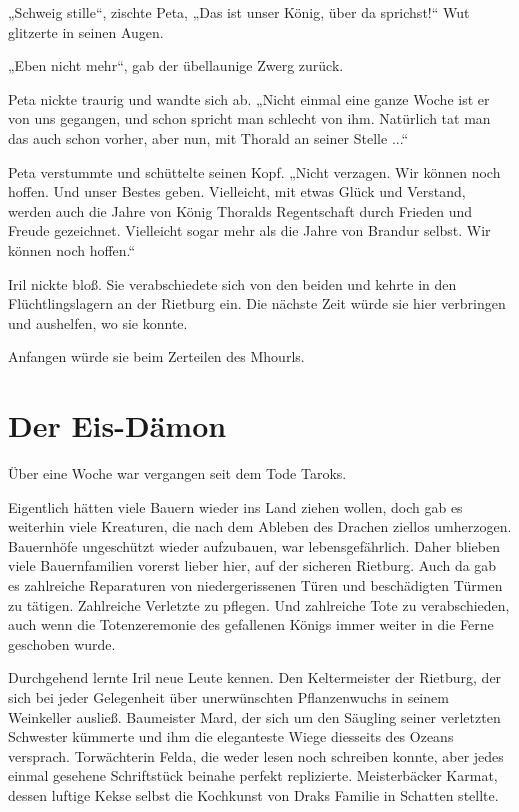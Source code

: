 „Schweig stille“, zischte Peta, „Das ist unser König, über da sprichst!“ Wut glitzerte in seinen Augen.

„Eben nicht mehr“, gab der übellaunige Zwerg zurück.

Peta nickte traurig und wandte sich ab. „Nicht einmal eine ganze Woche ist er von uns gegangen, und schon spricht man schlecht von ihm. Natürlich tat man das auch schon vorher, aber nun, mit Thorald an seiner Stelle ...“

Peta verstummte und schüttelte seinen Kopf. „Nicht verzagen. Wir können noch hoffen. Und unser Bestes geben. Vielleicht, mit etwas Glück und Verstand, werden auch die Jahre von König Thoralds Regentschaft durch Frieden und Freude gezeichnet. Vielleicht sogar mehr als die Jahre von Brandur selbst. Wir können noch hoffen.“

Iril nickte bloß. Sie verabschiedete sich von den beiden und kehrte in den Flüchtlingslagern an der Rietburg ein. Die nächste Zeit würde sie hier verbringen und aushelfen, wo sie konnte.

Anfangen würde sie beim Zerteilen des Mhourls.







\newpage
\section{Der Eis-Dämon}

Über eine Woche war vergangen seit dem Tode Taroks.

Eigentlich hätten viele Bauern wieder ins Land ziehen wollen, doch gab es weiterhin viele Kreaturen, die nach dem Ableben des Drachen ziellos umherzogen. Bauernhöfe ungeschützt wieder aufzubauen, war lebensgefährlich. Daher blieben viele Bauernfamilien vorerst lieber hier, auf der sicheren Rietburg. Auch da gab es zahlreiche Reparaturen von niedergerissenen Türen und beschädigten Türmen zu tätigen. Zahlreiche Verletzte zu pflegen. Und zahlreiche Tote zu verabschieden, auch wenn die Totenzeremonie des gefallenen Königs immer weiter in die Ferne geschoben wurde.

Durchgehend lernte Iril neue Leute kennen. Den Keltermeister der Rietburg, der sich bei jeder Gelegenheit über unerwünschten Pflanzenwuchs in seinem Weinkeller ausließ. Baumeister Mard, der sich um den Säugling seiner verletzten Schwester kümmerte und ihm die eleganteste Wiege diesseits des Ozeans versprach. Torwächterin Felda, die weder lesen noch schreiben konnte, aber jedes einmal gesehene Schriftstück beinahe perfekt replizierte. Meisterbäcker Karmat, dessen luftige Kekse selbst die Kochkunst von Draks Familie in Schatten stellte.

